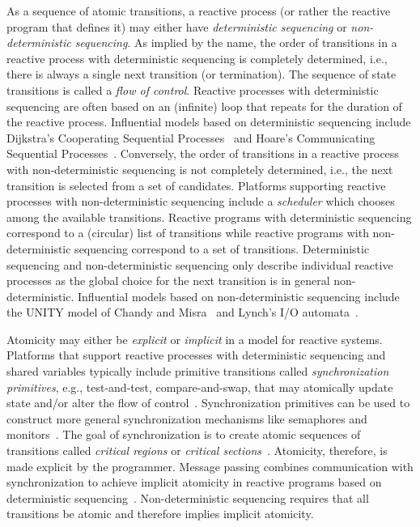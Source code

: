 As a sequence of atomic transitions, a reactive process (or rather the reactive program that defines it) may either have \emph{deterministic sequencing} or \emph{non-deterministic sequencing}.
As implied by the name, the order of transitions in a reactive process with deterministic sequencing is completely determined, i.e., there is always a single next transition (or termination).
The sequence of state transitions is called a \emph{flow of control}.
Reactive processes with deterministic sequencing are often based on an (infinite) loop that repeats for the duration of the reactive process.
Influential models based on deterministic sequencing include Dijkstra's Cooperating Sequential Processes~\cite{dijkstra1965cooperating} and Hoare's Communicating Sequential Processes~\cite{hoare1978communicating}.
Conversely, the order of transitions in a reactive process with non-deterministic sequencing is not completely determined, i.e., the next transition is selected from a set of candidates.
Platforms supporting reactive processes with non-deterministic sequencing include a \emph{scheduler} which chooses among the available transitions.
Reactive programs with deterministic sequencing correspond to a (circular) list of transitions while reactive programs with non-deterministic sequencing correspond to a set of transitions.
Deterministic sequencing and non-deterministic sequencing only describe individual reactive processes as the global choice for the next transition is in general non-deterministic.
Influential models based on non-deterministic sequencing include the UNITY model of Chandy and Misra~\cite{chandy1989parallel} and Lynch's I/O automata~\cite{nancy1996distributed}.

Atomicity may either be \emph{explicit} or \emph{implicit} in a model for reactive systems.
Platforms that support reactive processes with deterministic sequencing and shared variables typically include primitive transitions called \emph{synchronization primitives}, e.g., test-and-test, compare-and-swap, that may atomically update state and/or alter the flow of control~\cite{andrews1983concepts}.
Synchronization primitives can be used to construct more general synchronization mechanisms like semaphores and monitors~\cite{dijkstra1965cooperating}.
The goal of synchronization is to create atomic sequences of transitions called \emph{critical regions} or \emph{critical sections}~\cite{andrews1983concepts}.
Atomicity, therefore, is made explicit by the programmer.
Message passing combines communication with synchronization to achieve implicit atomicity in reactive programs based on deterministic sequencing~\cite{andrews1983concepts}.
Non-deterministic sequencing requires that all transitions be atomic and therefore implies implicit atomicity.

